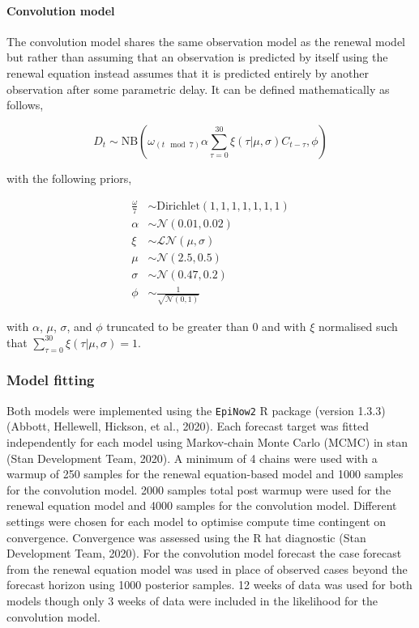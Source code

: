 \documentclass[
]{article}
\begin{document}
\hypertarget{convolution-model}{%
\paragraph{Convolution model}\label{convolution-model}}

The convolution model shares the same observation model as the renewal model but rather than assuming that an observation is predicted by itself using the renewal equation instead assumes that it is predicted entirely by another observation after some parametric delay. It can be defined mathematically as follows,

\begin{equation} 
    D_{t} \sim \mathrm{NB}\left(\omega_{(t \mod 7)} \alpha \sum_{\tau = 0}^{30} \xi(\tau | \mu, \sigma) C_{t-\tau},  \phi \right)
\end{equation}

with the following priors,

\begin{align}
    \frac{\omega}{7} &\sim \mathrm{Dirichlet}(1, 1, 1, 1, 1, 1, 1) \\
    \alpha &\sim \mathcal{N}(0.01, 0.02) \\
    \xi &\sim \mathcal{LN}(\mu, \sigma) \\
    \mu &\sim \mathcal{N}(2.5, 0.5) \\
\sigma &\sim \mathcal{N}(0.47, 0.2) \\
\phi &\sim \frac{1}{\sqrt{\mathcal{N}(0, 1)}}
\end{align}

with \(\alpha\), \(\mu\), \(\sigma\), and \(\phi\) truncated to be greater than 0 and with \(\xi\) normalised such that \(\sum_{\tau = 0}^{30} \xi(\tau | \mu, \sigma) = 1\).

\hypertarget{model-fitting}{%
\subsubsection{Model fitting}\label{model-fitting}}

Both models were implemented using the \texttt{EpiNow2} R package (version 1.3.3) (Abbott, Hellewell, Hickson, et al., 2020). Each forecast target was fitted independently for each model using Markov-chain Monte Carlo (MCMC) in stan (Stan Development Team, 2020). A minimum of 4 chains were used with a warmup of 250 samples for the renewal equation-based model and 1000 samples for the convolution model. 2000 samples total post warmup were used for the renewal equation model and 4000 samples for the convolution model. Different settings were chosen for each model to optimise compute time contingent on convergence. Convergence was assessed using the R hat diagnostic (Stan Development Team, 2020). For the convolution model forecast the case forecast from the renewal equation model was used in place of observed cases beyond the forecast horizon using 1000 posterior samples. 12 weeks of data was used for both models though only 3 weeks of data were included in the likelihood for the convolution model.
\end{document}
